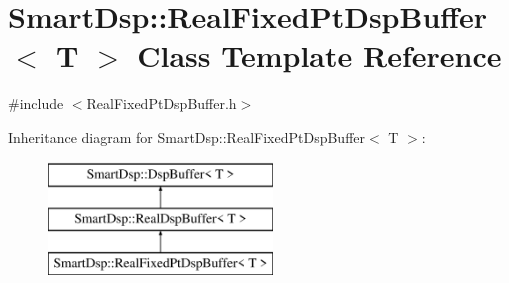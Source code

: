 \hypertarget{class_smart_dsp_1_1_real_fixed_pt_dsp_buffer}{\section{Smart\+Dsp\+:\+:Real\+Fixed\+Pt\+Dsp\+Buffer$<$ T $>$ Class Template Reference}
\label{class_smart_dsp_1_1_real_fixed_pt_dsp_buffer}
}


{\ttfamily \#include $<$Real\+Fixed\+Pt\+Dsp\+Buffer.\+h$>$}

Inheritance diagram for Smart\+Dsp\+:\+:Real\+Fixed\+Pt\+Dsp\+Buffer$<$ T $>$\+:\begin{figure}[H]
\begin{center}
\leavevmode
\includegraphics[height=3.000000cm]{class_smart_dsp_1_1_real_fixed_pt_dsp_buffer}
\end{center}
\end{figure}
